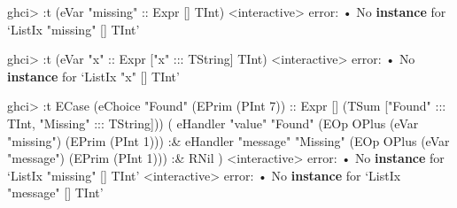 \documentclass[]{article}
\newenvironment{Shaded}{}{}
\newcommand{\DataTypeTok}[1]{\textcolor[rgb]{0.56,0.13,0.00}{#1}}
\newcommand{\DecValTok}[1]{\textcolor[rgb]{0.25,0.63,0.44}{#1}}
\newcommand{\FunctionTok}[1]{\textcolor[rgb]{0.02,0.16,0.49}{#1}}
\newcommand{\KeywordTok}[1]{\textcolor[rgb]{0.00,0.44,0.13}{\textbf{#1}}}
\newcommand{\NormalTok}[1]{#1}
\newcommand{\OperatorTok}[1]{\textcolor[rgb]{0.40,0.40,0.40}{#1}}
\newcommand{\OtherTok}[1]{\textcolor[rgb]{0.00,0.44,0.13}{#1}}
\newcommand{\StringTok}[1]{\textcolor[rgb]{0.25,0.44,0.63}{#1}}
\begin{document}
\begin{Shaded}
\begin{Highlighting}[]
\NormalTok{ghci}\OperatorTok{\textgreater{}} \OperatorTok{:}\NormalTok{t (eVar }\StringTok{"missing"}\OtherTok{ ::} \DataTypeTok{Expr}\NormalTok{ \textquotesingle{}[] }\DataTypeTok{TInt}\NormalTok{)}
\OperatorTok{\textless{}}\NormalTok{interactive}\OperatorTok{\textgreater{}} \FunctionTok{error}\OperatorTok{:}
\NormalTok{    • }\DataTypeTok{No} \KeywordTok{instance}\NormalTok{ for ‘}\DataTypeTok{ListIx} \StringTok{"missing"}\NormalTok{ \textquotesingle{}[] }\DataTypeTok{TInt}\NormalTok{’}

\NormalTok{ghci}\OperatorTok{\textgreater{}} \OperatorTok{:}\NormalTok{t (eVar }\StringTok{"x"}\OtherTok{ ::} \DataTypeTok{Expr}\NormalTok{ \textquotesingle{}[}\StringTok{"x"} \OperatorTok{:::} \DataTypeTok{TString}\NormalTok{] }\DataTypeTok{TInt}\NormalTok{)}
\OperatorTok{\textless{}}\NormalTok{interactive}\OperatorTok{\textgreater{}} \FunctionTok{error}\OperatorTok{:}
\NormalTok{    • }\DataTypeTok{No} \KeywordTok{instance}\NormalTok{ for ‘}\DataTypeTok{ListIx} \StringTok{"x"}\NormalTok{ \textquotesingle{}[] }\DataTypeTok{TInt}\NormalTok{’}

\NormalTok{ghci}\OperatorTok{\textgreater{}} \OperatorTok{:}\NormalTok{t }\DataTypeTok{ECase}
\NormalTok{      (eChoice }\StringTok{"Found"}\NormalTok{ (}\DataTypeTok{EPrim}\NormalTok{ (}\DataTypeTok{PInt} \DecValTok{7}\NormalTok{))}\OtherTok{ ::} \DataTypeTok{Expr}\NormalTok{ \textquotesingle{}[] (}\DataTypeTok{TSum}\NormalTok{ \textquotesingle{}[}\StringTok{"Found"} \OperatorTok{:::} \DataTypeTok{TInt}\NormalTok{, }\StringTok{"Missing"} \OperatorTok{:::} \DataTypeTok{TString}\NormalTok{]))}
\NormalTok{      ( eHandler }\StringTok{"value"} \StringTok{"Found"}\NormalTok{ (}\DataTypeTok{EOp} \DataTypeTok{OPlus}\NormalTok{ (eVar }\StringTok{"missing"}\NormalTok{) (}\DataTypeTok{EPrim}\NormalTok{ (}\DataTypeTok{PInt} \DecValTok{1}\NormalTok{)))}
          \OperatorTok{:\&}\NormalTok{ eHandler }\StringTok{"message"} \StringTok{"Missing"}\NormalTok{ (}\DataTypeTok{EOp} \DataTypeTok{OPlus}\NormalTok{ (eVar }\StringTok{"message"}\NormalTok{) (}\DataTypeTok{EPrim}\NormalTok{ (}\DataTypeTok{PInt} \DecValTok{1}\NormalTok{)))}
          \OperatorTok{:\&} \DataTypeTok{RNil}
\NormalTok{      )}
\OperatorTok{\textless{}}\NormalTok{interactive}\OperatorTok{\textgreater{}} \FunctionTok{error}\OperatorTok{:}
\NormalTok{    • }\DataTypeTok{No} \KeywordTok{instance}\NormalTok{ for ‘}\DataTypeTok{ListIx} \StringTok{"missing"}\NormalTok{ \textquotesingle{}[] }\DataTypeTok{TInt}\NormalTok{’}
\OperatorTok{\textless{}}\NormalTok{interactive}\OperatorTok{\textgreater{}} \FunctionTok{error}\OperatorTok{:}
\NormalTok{    • }\DataTypeTok{No} \KeywordTok{instance}\NormalTok{ for ‘}\DataTypeTok{ListIx} \StringTok{"message"}\NormalTok{ \textquotesingle{}[] }\DataTypeTok{TInt}\NormalTok{’}
\end{Highlighting}
\end{Shaded}
\end{document}
